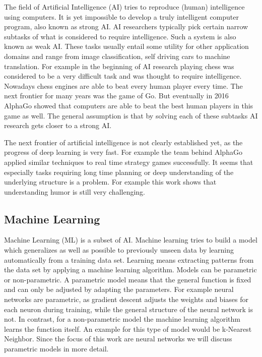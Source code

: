 \documentclass[draft,final,oneside]{vutinfth} %
\begin{document}
The field of Artificial Intelligence (AI) tries to reproduce (human) intelligence using computers. It is yet impossible to develop a truly intelligent computer program, also known as strong AI. AI researchers typically pick certain narrow subtasks of what is considered to require intelligence. Such a system is also known as weak AI. These tasks usually entail some utility for other application domains and range from image classification, self driving cars to machine translation. For example in the beginning of AI research playing chess was considered to be a very difficult task and was thought to require intelligence. Nowadays chess engines are able to beat every human player every time. The next frontier for many years was the game of Go. But eventually in 2016 AlphaGo showed that computers are able to beat the best human players in this game as well. The general assumption is that by solving each of these subtasks AI research gets closer to a strong AI. 

The next frontier of artificial intelligence is not clearly established yet, as the progress of deep learning is very fast. For example the team behind AlphaGo applied similar techniques to real time strategy games successfully. It seems that especially tasks requiring long time planning or deep understanding of the underlying structure is a problem. For example this work shows that understanding humor is still very challenging.




\subsection{Machine Learning}

Machine Learning (ML) is a subset of AI. Machine learning tries to build a model which generalizes as well as possible to previously unseen data by learning automatically from a training data set. Learning means extracting patterns from the data set by applying a machine learning algorithm. Models can be parametric or non-parametric. A parametric model means that the general function is fixed and can only be adjusted by adapting the parameters. For example neural networks are parametric, as gradient descent adjusts the weights and biases for each neuron during training, while the general structure of the neural network is not. In contrast, for a non-parametric model the machine learning algorithm learns the function itself. An example for this type of model would be k-Nearest Neighbor.  Since the focus of this work are neural networks we will discuss parametric models in more detail.
\end{document}
